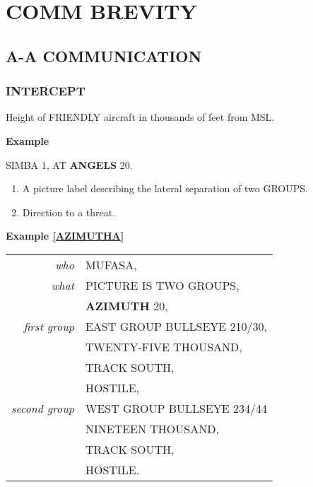\chapter{COMM BREVITY}
\localtableofcontents
\thispagestyle{plain}
\cleardoublepage

\section{A-A COMMUNICATION}

\subsection{INTERCEPT}

\begin{tcoloritemize}
    \blueitem[ANGELS]
    Height of FRIENDLY aircraft in thousands of feet from MSL.

    \medskip
    \textbf{Example}
    \begin{center}
        \begin{minipage}{0.9\textwidth}
            SIMBA 1, AT \textbf{ANGELS} 20.
        \end{minipage}
    \end{center}    

    \blueitem[AZIMUTH]
    \begin{enumerate}
        \item \label{AZIMUTHA} A picture label describing the lateral separation of two GROUPS.
        \item \label{AZIMUTHB} Direction to a threat.
    \end{enumerate}

    \medskip
    \textbf{Example \ref{AZIMUTHA}}
    \begin{center}
        
        \begin{tabular}{>{\itshape}r l}
            who & MUFASA, \\
            what & PICTURE IS TWO GROUPS, \\
            & \textbf{AZIMUTH} 20, \\
            first group & EAST GROUP BULLSEYE 210/30, \\
            & TWENTY-FIVE THOUSAND, \\
            & TRACK SOUTH, \\
            & HOSTILE, \\
            second group & WEST GROUP BULLSEYE 234/44 \\
            & NINETEEN THOUSAND, \\
            & TRACK SOUTH, \\
            & HOSTILE. \\
        \end{tabular}
    \end{center}


\end{tcoloritemize}
